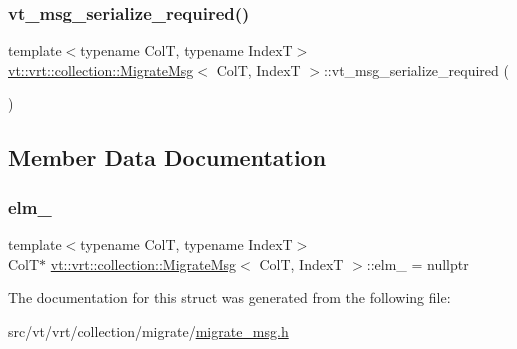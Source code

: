 \mbox{\label{structvt_1_1vrt_1_1collection_1_1_migrate_msg_ad6dcb8f2f1555556800b50195d219c19}} 
\subsubsection{\texorpdfstring{vt\+\_\+msg\+\_\+serialize\+\_\+required()}{vt\_msg\_serialize\_required()}}
{\footnotesize\ttfamily template$<$typename ColT, typename IndexT$>$ \\
\hyperlink{structvt_1_1vrt_1_1collection_1_1_migrate_msg}{vt\+::vrt\+::collection\+::\+Migrate\+Msg}$<$ ColT, IndexT $>$\+::vt\+\_\+msg\+\_\+serialize\+\_\+required (\begin{DoxyParamCaption}{ }\end{DoxyParamCaption})}



\subsection{Member Data Documentation}
\mbox{\label{structvt_1_1vrt_1_1collection_1_1_migrate_msg_aa074fd362c469f1a0aae30d1cf9888bf}} 
\subsubsection{\texorpdfstring{elm\+\_\+}{elm\_}}
{\footnotesize\ttfamily template$<$typename ColT, typename IndexT$>$ \\
ColT$\ast$ \hyperlink{structvt_1_1vrt_1_1collection_1_1_migrate_msg}{vt\+::vrt\+::collection\+::\+Migrate\+Msg}$<$ ColT, IndexT $>$\+::elm\+\_\+ = nullptr}



The documentation for this struct was generated from the following file\+:\begin{DoxyCompactItemize}
\item 
src/vt/vrt/collection/migrate/\hyperlink{migrate__msg_8h}{migrate\+\_\+msg.\+h}\end{DoxyCompactItemize}

